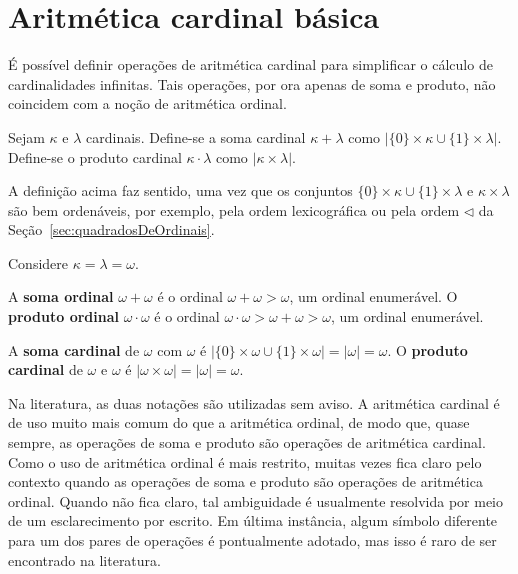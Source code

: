 \section{Aritmética cardinal básica}

É possível definir operações de aritmética cardinal para simplificar o cálculo de cardinalidades infinitas.
Tais operações, por ora apenas de soma e produto, não coincidem com a noção de aritmética ordinal.

\begin{definition}
    Sejam $\kappa$ e $\lambda$ cardinais.
    Define-se a soma cardinal $\kappa + \lambda$ como $|\{0\}\times \kappa \cup \{1\}\times \lambda|$.
    Define-se o produto cardinal $\kappa \cdot \lambda$ como $|\kappa \times \lambda|$.
\end{definition}

A definição acima faz sentido, uma vez que os conjuntos $\{0\}\times \kappa \cup \{1\}\times \lambda$ e $\kappa \times \lambda$ são bem ordenáveis, por exemplo, pela ordem lexicográfica ou pela ordem $\triangleleft$ da Seção~\ref{sec:quadradosDeOrdinais}.

\begin{example}
    Considere $\kappa=\lambda=\omega$.
    
    A \textbf{soma ordinal} $\omega+\omega$ é o ordinal $\omega + \omega>\omega$, um ordinal enumerável.
    O \textbf{produto ordinal} $\omega\cdot\omega$ é o ordinal $\omega \cdot \omega>\omega+\omega>\omega$, um ordinal enumerável.

    A \textbf{soma cardinal} de $\omega$ com $\omega$ é $|\{0\}\times \omega \cup \{1\}\times \omega|=|\omega|=\omega$.
    O \textbf{produto cardinal} de $\omega$ e $\omega$ é $|\omega \times \omega|=|\omega|=\omega$.
\end{example}

Na literatura, as duas notações são utilizadas sem aviso.
A aritmética cardinal é de uso muito mais comum do que a aritmética ordinal, de modo que, quase sempre, as operações de soma e produto são operações de aritmética cardinal.
Como o uso de aritmética ordinal é mais restrito, muitas vezes fica claro pelo contexto quando as operações de soma e produto são operações de aritmética ordinal.
Quando não fica claro, tal ambiguidade é usualmente resolvida por meio de um esclarecimento por escrito.
Em última instância, algum símbolo diferente para um dos pares de operações é pontualmente adotado, mas isso é raro de ser encontrado na literatura.

